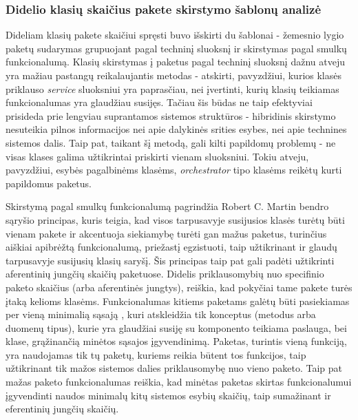 \subsubsection{Didelio klasių skaičius pakete skirstymo šablonų analizė}
Dideliam klasių pakete skaičiui spręsti buvo išskirti du šablonai - žemesnio lygio paketų sudarymas grupuojant pagal techninį sluoksnį ir
skirstymas pagal smulkų funkcionalumą.
Klasių skirstymas į paketus pagal techninį sluoksnį dažnu atveju yra mažiau pastangų reikalaujantis metodas - atskirti,
pavyzdžiui, kurios klasės priklauso \textit{service} sluoksniui yra paprasčiau, nei įvertinti, kurių klasių teikiamas funkcionalumas yra glaudžiau susijęs.
Tačiau šis būdas ne taip efektyviai prisideda prie lengviau suprantamos sistemos struktūros -
hibridinis skirstymo nesuteikia pilnos informacijos nei apie dalykinės srities esybes, nei apie technines sistemos dalis.
Taip pat, taikant šį metodą, gali kilti papildomų problemų - ne visas klases galima užtikrintai priskirti vienam sluoksniui.
Tokiu atveju, pavyzdžiui, esybės pagalbinėms klasėms, \textit{orchestrator} tipo klasėms reikėtų kurti papildomus paketus.

Skirstymą pagal smulkų funkcionalumą pagrindžia Robert C. Martin bendro sąryšio principas, kuris teigia, kad visos tarpusavyje susijusios klasės turėtų būti vienam pakete ir
akcentuoja siekiamybę turėti gan mažus paketus, turinčius aiškiai apibrėžtą funkcionalumą, priežastį egzistuoti, taip užtikrinant ir
glaudų tarpusavyje susijusių klasių saryšį.
Šis principas taip pat gali padėti užtikrinti aferentinių jungčių skaičių paketuose.
Didelis priklausomybių nuo specifinio paketo skaičius (arba aferentinės jungtys), reiškia, kad pokyčiai tame pakete turės įtaką kelioms klasėms.
Funkcionalumas kitiems paketams galėtų būti pasiekiamas per vieną minimalią sąsają ,
kuri atskleidžia tik konceptus (metodus arba duomenų tipus), kurie yra glaudžiai susiję su komponento teikiama paslauga, bei
klase, grąžinančią minėtos sąsajos įgyvendinimą.
Paketas, turintis vieną funkciją, yra naudojamas tik tų paketų, kuriems reikia būtent tos funkcijos,
taip užtikrinant tik mažos sistemos dalies priklausomybę nuo vieno paketo.
Taip pat mažas paketo funkcionalumas reiškia, kad minėtas paketas skirtas funkcionalumui įgyvendinti naudos minimalų kitų sistemos esybių skaičių,
taip sumažinant ir eferentinių jungčių skaičių.

